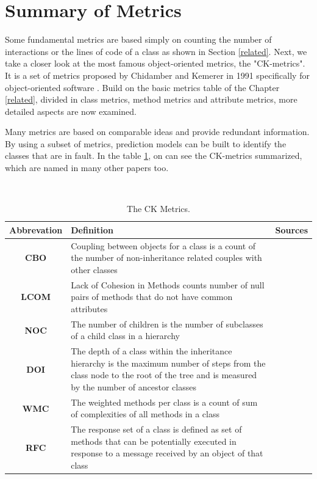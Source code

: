 \section{Summary of Metrics}\label{analysis}

Some fundamental metrics are based simply on counting the number of interactions or the lines of code of a class as shown in Section \ref{related}. Next, we take a closer look at the most famous object-oriented metrics, the "CK-metrics". It is a set of metrics proposed by Chidamber and Kemerer in 1991 specifically for object-oriented software \cite{b15chidamber1991towards}. Build on the basic metrics table of the Chapter \ref{related}, divided in class metrics, method metrics and attribute metrics, more detailed aspects are now examined. 

Many metrics are based on comparable ideas and provide redundant information. By using a subset of metrics, prediction models can be built to identify the classes that are in fault. In the table \ref{tab:metrics}, on can see the CK-metrics summarized, which are named in many other papers too.

\begin{table}
	\caption{The CK Metrics.}~\label{tab:metrics}
	
	\setlength\tabcolsep{3pt}
	\renewcommand{\arraystretch}{1.4}%
	\begin{tabularx}{\columnwidth}{ | c | p{5.6cm} || c | }
		\hline
		Abbrevation & Definition & Sources \\ \hline\hline
		\textbf{CBO} & Coupling between objects for a class is a count of the number of non-inheritance related couples with other classes & \cite{b15chidamber1991towards, b1aggarwal2007investigating, b3al2012fault} \\ \hline
		\textbf{LCOM} & Lack of Cohesion in Methods counts number of null pairs of methods that do not have common attributes & \cite{b15chidamber1991towards, b1aggarwal2007investigating} \\ \hline
		\textbf{NOC} & The number of children is the number of subclasses of a child class in a hierarchy & \cite{b15chidamber1991towards, b1aggarwal2007investigating} \\ \hline
		\textbf{DOI} & The depth of a class within the inheritance hierarchy is the maximum number of steps from the class node to the root of the tree and is measured by the number of ancestor classes & \cite{b15chidamber1991towards, b1aggarwal2007investigating} \\ \hline
		\textbf{WMC} & The weighted methods per class is a count of sum of complexities of all methods in a class & \cite{b15chidamber1991towards, b1aggarwal2007investigating} \\ \hline
		\textbf{RFC} & The response set of a class is defined as set of methods that can be potentially executed in response to a message received by an object of that class & \cite{b15chidamber1991towards, b1aggarwal2007investigating} \\ \hline
	\end{tabularx}
\end{table}

